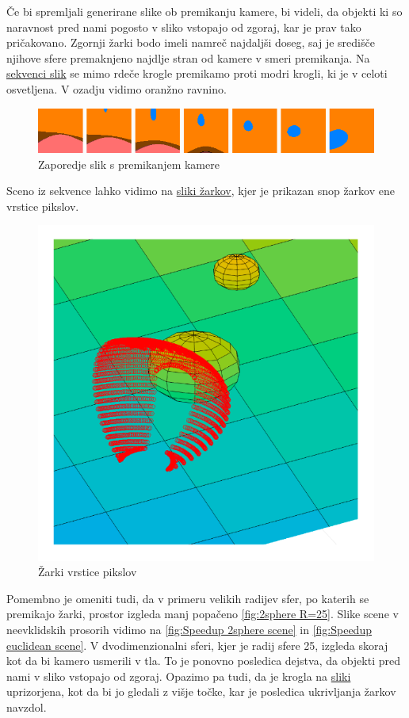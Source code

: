 \documentclass[titlepage]{article}
\begin{document}
\bigskip
Če bi spremljali generirane slike ob premikanju kamere, bi videli, da objekti ki so naravnost pred nami pogosto v sliko vstopajo od zgoraj, kar je prav tako pričakovano. Zgornji žarki bodo imeli namreč najdaljši doseg, saj je središče njihove sfere premaknjeno najdlje stran od kamere v smeri premikanja. Na \hyperref[fig:sequence]{sekvenci slik} se mimo rdeče krogle premikamo proti modri krogli, ki je v celoti osvetljena. V ozadju vidimo oranžno ravnino.
\begin{figure}[H]
    \centering
    \includegraphics[width=1\linewidth]{Images/sequence.png}
    \caption{Zaporedje slik s premikanjem kamere}
    \label{fig:sequence}
\end{figure}
Sceno iz sekvence lahko vidimo na \hyperref[fig:2sphRays2]{sliki žarkov}, kjer je prikazan snop žarkov ene vrstice pikslov.
\begin{figure}[H]
    \centering
    \includegraphics[width=0.4\linewidth]{Images/2sphere_rays2.png}
    \caption{Žarki vrstice pikslov}
    \label{fig:2sphRays2}
\end{figure}


Pomembno je omeniti tudi, da v primeru velikih radijev sfer, po katerih se premikajo žarki, prostor izgleda manj popačeno \ref{fig:2sphere R=25}. 
Slike scene v neevklidskih prosorih vidimo na \ref{fig:Speedup 2sphere scene} in \ref{fig:Speedup euclidean scene}. V dvodimenzionalni sferi, kjer je radij sfere 25, izgleda skoraj kot da bi kamero usmerili v tla. To je 
ponovno posledica dejstva, da objekti pred nami v sliko vstopajo od zgoraj. Opazimo pa tudi, da je krogla na \hyperref[fig:2sphere R=25]{sliki} 
uprizorjena, kot da bi jo gledali z višje točke, kar je posledica ukrivljanja žarkov navzdol.
\end{document}
